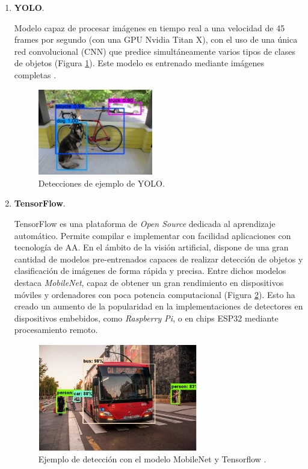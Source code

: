 \begin{enumerate}
	\item \textbf{YOLO}.
	
	Modelo capaz de procesar imágenes en tiempo real a una velocidad de 45 frames por segundo (con una GPU Nvidia Titan X), con el uso de una única red convolucional (CNN) que predice simultáneamente varios tipos de clases de objetos (Figura \ref{fig:yoloExample}). Este modelo es entrenado mediante imágenes completas \cite{YOLO}.
	
	\begin{figure}[htp]
		\centering
		\includegraphics[width=5cm]{imagenes/yolo_example.jpg}
		\caption{Detecciones de ejemplo de YOLO.}
		\label{fig:yoloExample}
	\end{figure}
	
	\item \textbf{TensorFlow}.
	
	TensorFlow es una plataforma de \textit{Open Source} dedicada al aprendizaje automático. Permite compilar e implementar con facilidad aplicaciones con tecnología de AA. En el ámbito de la visión artificial, dispone de una gran cantidad de modelos pre-entrenados capaces de realizar detección de objetos y clasificación de imágenes de forma rápida y precisa. Entre dichos modelos destaca \textit{MobileNet}, capaz de obtener un gran rendimiento en dispositivos móviles y ordenadores con poca potencia computacional (Figura \ref{fig:mobilenetExample}). Esto ha creado un aumento de la popularidad en la implementaciones de detectores en dispositivos embebidos, como \textit{Raspberry Pi}, o en chips ESP32 mediante procesamiento remoto.
	
	\begin{figure}[htp]
		\centering
		\includegraphics[width=7cm]{imagenes/mobilenet_example.png}
		\caption{Ejemplo de detección con el modelo MobileNet y Tensorflow \cite{mobilenet1}.}
		\label{fig:mobilenetExample}
	\end{figure}
	

\end{enumerate}
